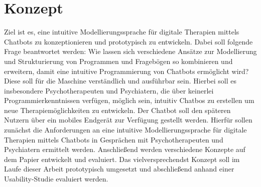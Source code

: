 \section{Konzept}
\label{ch:Konzept}
Ziel ist es, eine intuitive Modellierungssprache für digitale Therapien mittels Chatbots zu konzeptionieren und prototypisch zu entwickeln. Dabei soll folgende Frage beantwortet werden: Wie lassen sich verschiedene Ansätze zur Modellierung und Strukturierung von Programmen und Fragebögen so kombinieren und erweitern, damit eine intuitive Programmierung von Chatbots ermöglicht wird? Diese soll für die Maschine verständlich und ausführbar sein. Hierbei soll es insbesondere Psychotherapeuten und Psychiatern, die über keinerlei Programmierkenntnissen verfügen, möglich sein, intuitiv Chatbos zu erstellen um neue Therapiemöglichkeiten zu entwickeln. Der Chatbot soll den späteren Nutzern über ein mobiles Endgerät zur Verfügung gestellt werden. Hierfür sollen zunächst die Anforderungen an eine intuitive Modellierungssprache für digitale Therapien mittels Chatbots in Gesprächen mit Psychotherapeuten und Psychiatern ermittelt werden. Anschließend werden verschiedene Konzepte auf dem Papier entwickelt und evaluiert. Das vielversprechendst Konzept soll im Laufe dieser Arbeit prototypisch umgesetzt und abschließend anhand einer Usability-Studie evaluiert werden. 
